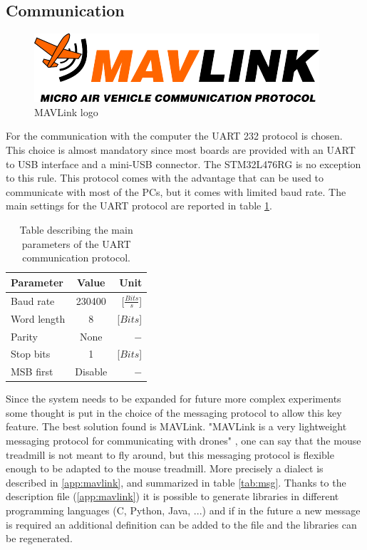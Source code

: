 \documentclass[12pt,a4paper, twoside]{article}
\begin{document}
\subsection{Communication}\label{sec:com}

\begin{figure}
	\includegraphics[width=\linewidth]{fig/MAVLink_logo.png}
	\caption{MAVLink logo}\label{fig:MAVLink_logo}
\end{figure}
For the communication with the computer the UART 232 protocol is chosen. This choice is almost mandatory since most boards are provided with an UART to USB interface and a mini-USB connector. The STM32L476RG is no exception to this rule. This protocol comes with the advantage that can be used to communicate with most of the PCs, but it comes with limited baud rate. The main settings for the UART protocol are reported in table \ref{tab:UART}.

\begin{table}[H]
	\centering
	\begin{tabular}{l||c|r} 
		\textbf{Parameter} &\textbf{Value} &\textbf{Unit}\\ 
		\hline
		\hline 
		Baud rate & 230400 & [$\frac{Bits}{s}$] \\ 
		\hline 
		Word length & 8 & [$Bits$] \\ 
		\hline 
		Parity & None & $-$\\ 
		\hline 
		Stop bits & 1 & [$Bits$]\\ 
		\hline 
		MSB first & Disable & $-$  \\ 
	\end{tabular} 
	\caption[UART communication parameters]{Table describing the main parameters of the UART communication protocol.}
	\label{tab:UART}
\end{table}

Since the system needs to be expanded for future more complex experiments some thought is put in the choice of the messaging protocol to allow this key feature.
The best solution found is MAVLink. "MAVLink is a very lightweight messaging protocol for communicating with drones" \cite{mavlink}, one can say that the mouse treadmill is not meant to fly around, but this messaging protocol is flexible enough to be adapted to the mouse treadmill.
More precisely a dialect is described in \ref{app:mavlink}, and summarized in table \ref{tab:msg}. Thanks to the description file (\ref{app:mavlink}) it is possible to generate libraries in different programming languages (C, Python, Java, ...) and if in the future a new message is required an additional definition can be added to the file and the libraries can be regenerated.\\
\end{document}
